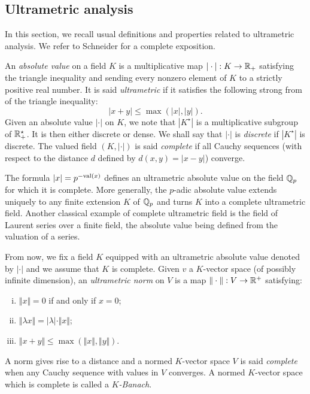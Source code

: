 \documentclass{amsart}
\begin{document}
\subsection{Ultrametric analysis}
\label{ssec:ultrametric}

In this section, we recall usual definitions and properties related to
ultrametric analysis. We refer to Schneider \cite{Schneider} for a 
complete exposition.

An \emph{absolute value} on a field $K$ is a multiplicative map $|\cdot| 
: K \to \mathbb R_+$ satisfying the triangle inequality and sending every 
nonzero element of $K$ to a strictly positive real number. It is said 
\emph{ultrametric} if it satisfies the following strong from of the 
triangle inequality:
$$|x+y| \leq \max(|x|, |y|).$$
Given an absolute value $|\cdot|$ on $K$, we note that $|K^\star|$ is a 
multiplicative subgroup of $\mathbb R_+^\star$. It is then either discrete or 
dense. We shall say that $|\cdot|$ is \emph{discrete} if $|K^\star|$ is
discrete. The valued field $(K, |\cdot|)$ is said \emph{complete} if all 
Cauchy sequences (with respect to the distance $d$ defined by $d(x,y) = 
|x-y|$) converge.

The formula $|x| = p^{-\text{\rm val}(x)}$ defines an ultrametric absolute value on 
the field $\mathbb Q_p$ for which it is complete. More generally, the $p$-adic 
absolute value extends uniquely to any finite extension $K$ of $\mathbb Q_p$ and 
turns $K$ into a complete ultrametric field. Another classical example of 
complete ultrametric field is the field of Laurent series over a finite
field, the absolute value being defined from the valuation of a series.

From now, we fix a field $K$ equipped with an ultrametric absolute value 
denoted by $|\cdot|$ and we assume that $K$ is complete. Given $v$ a 
$K$-vector space (of possibly infinite dimension), an \emph{ultrametric 
norm} on $V$ is a map $\Vert\cdot\Vert : V \to \mathbb R^+$ satisfying:
\begin{enumerate}[(i)]
\item $\Vert x\Vert = 0$ if and only if $x = 0$;
\item $\Vert \lambda x\Vert = |\lambda| \cdot \Vert x\Vert$;
\item $\Vert x+y\Vert \leq \max(\Vert x\Vert, \Vert y\Vert)$.
\end{enumerate}
A norm gives rise to a distance and a normed $K$-vector space $V$ is 
said \emph{complete} when any Cauchy sequence with values in $V$ 
converges. A normed $K$-vector space which is complete is called a 
\emph{$K$-Banach}.
\end{document}
